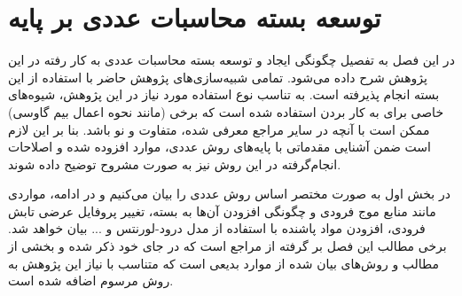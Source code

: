 \chapter{توسعه بسته محاسبات عددی بر پایه}\label{chap2}
در این فصل به تفصیل چگونگی ایجاد و توسعه بسته محاسبات عددی به کار رفته در این پژوهش شرح داده می‌شود. تمامی شبیه‌سازی‌های پژوهش حاضر با استفاده از این بسته انجام پذیرفته است. به تناسب نوع استفاده مورد نیاز در این پژوهش، شیوه‌های خاصی برای به کار بردن  استفاده شده است که برخی (مانند نحوه اعمال بیم گاوسی) ممکن است با آنچه در سایر مراجع معرفی شده، متفاوت و نو باشد. بنا بر این لازم است ضمن آشنایی مقدماتی با پایه‌های روش عددی، موارد افزوده شده و اصلاحات انجام‌گرفته در این روش نیز به صورت مشروح توضیح داده شوند.

در بخش اول به صورت مختصر اساس روش عددی را بیان می‌کنیم و در ادامه، مواردی مانند منابع موج فرودی و چگونگی افزودن آن‌ها به بسته، تغییر پروفایل عرضی تابش فرودی، افزودن مواد پاشنده با استفاده از مدل درود-لورنتس و ... بیان خواهد شد. برخی مطالب این فصل بر گرفته از مراجع است که در جای خود ذکر شده و بخشی از مطالب و روش‌های بیان شده از موارد بدیعی است که متناسب با نیاز این پژوهش به روش مرسوم اضافه شده است.
